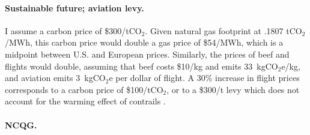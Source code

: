 \documentclass[12pt,english]{article}
\begin{document}
\begin{bibunit}
\paragraph{Sustainable future; aviation levy.}

I assume a carbon price of \$300/tCO$_\text{2}$. Given natural gas footprint at .1807 tCO$_\text{2}$/MWh, this carbon price would double a gas price of \$54/MWh, which is a midpoint between U.S. and European prices. Similarly, the prices of beef and flights would double, assuming that beef costs \$10/kg and emits 33~kgCO$_\text{2}$e/kg, and aviation emits 3~kgCO$_\text{2}$e per dollar of flight. A 30\% increase in flight prices corresponds to a carbon price of \$100/tCO$_\text{2}$, or to a \$300/t levy which does not account for the warming effect of contrails \citep{lee_contribution_2021}.


\paragraph{NCQG.} 


\end{bibunit}
\end{document}
